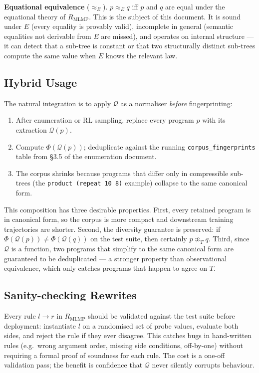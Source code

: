 \documentclass[11pt,a4paper]{article}
\begin{document}
\textbf{Equational equivalence} ($\approx_E$). $p \approx_E q$ iff $p$ and $q$ are equal under the equational theory of $R_{\text{MLMP}}$. This is the subject of this document. It is sound under $E$ (every equality is provably valid), incomplete in general (semantic equalities not derivable from $E$ are missed), and operates on internal structure --- it can detect that a sub-tree is constant or that two structurally distinct sub-trees compute the same value when $E$ knows the relevant law.

\subsection{Hybrid Usage}\label{sec:hybrid}

The natural integration is to apply $\mathcal{Q}$ as a normaliser \emph{before} fingerprinting:
\begin{enumerate}
\item After enumeration or RL sampling, replace every program $p$ with its extraction $\mathcal{Q}(p)$.
\item Compute $\Phi(\mathcal{Q}(p))$; deduplicate against the running \texttt{corpus\_fingerprints} table from §3.5 of the enumeration document.
\item The corpus shrinks because programs that differ only in compressible sub-trees (the \texttt{product (repeat 10 8)} example) collapse to the same canonical form.
\end{enumerate}

This composition has three desirable properties. First, every retained program is in canonical form, so the corpus is more compact and downstream training trajectories are shorter. Second, the diversity guarantee is preserved: if $\Phi(\mathcal{Q}(p)) \ne \Phi(\mathcal{Q}(q))$ on the test suite, then certainly $p \not\approx_T q$. Third, since $\mathcal{Q}$ is a function, two programs that simplify to the same canonical form are guaranteed to be deduplicated --- a stronger property than observational equivalence, which only catches programs that happen to agree on $T$.

\subsection{Sanity-checking Rewrites}\label{sec:rewrite-sanity}

Every rule $l \to r$ in $R_{\text{MLMP}}$ should be validated against the test suite before deployment: instantiate $l$ on a randomised set of probe values, evaluate both sides, and reject the rule if they ever disagree. This catches bugs in hand-written rules (e.g.\ wrong argument order, missing side conditions, off-by-one) without requiring a formal proof of soundness for each rule. The cost is a one-off validation pass; the benefit is confidence that $\mathcal{Q}$ never silently corrupts behaviour.
\end{document}
